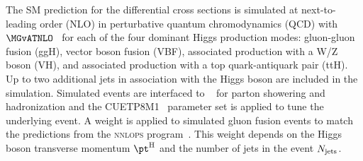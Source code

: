 The SM prediction for the differential cross sections is simulated at next-to-leading order (NLO) in perturbative quantum chromodynamics (QCD) with $\MGvATNLO$~\cite{Alwall:2014hca} for each of the four dominant Higgs production modes: gluon-gluon fusion (ggH), vector boson fusion (VBF), associated production with a W/Z boson (VH), and associated production with a top quark-antiquark pair (ttH).
% 
Up to two additional jets in association with the Higgs boson are included in the simulation.
% 
Simulated events are interfaced to \PYTHIA~\cite{Sjostrand:2014zea} for parton showering and hadronization and the CUETP8M1~\cite{Skands:1695787} parameter set is applied to tune the underlying event.
% 
A weight is applied to simulated gluon fusion events to match the predictions from the {\textsc{nnlops}} program~\cite{Hamilton:2012np, Kardos:2014dua}.
% 
This weight depends on the Higgs boson transverse momentum $\pth$ and the number of jets in the event $N_\text{jets}$.
% 
% 
% 


